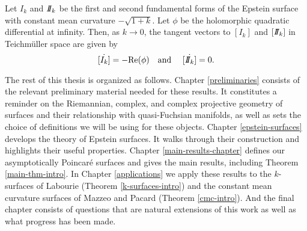 \begin{bigthm} \label{cmc-intro}
Let $I_k$ and $I\!\!I_k$ be the first and second fundamental forms of the Epstein surface with constant mean curvature $-\sqrt{1+k}$.
Let $\phi$ be the holomorphic quadratic differential at infinity. 
Then, as $k \to 0$, the tangent vectors to $[I_k]$ and $[I\!\!I_k]$ in Teichm\"uller space are given by 
\[
  \dot{[I_k]}= - \mathrm{Re}(\phi) \quad \text{and } \quad \dot{[I\!\!I_k]} = 0.
\]
\end{bigthm}

The rest of this thesis is organized as follows. 
Chapter \ref{preliminaries} consists of the relevant preliminary material needed for these results. 
It constitutes a reminder on the Riemannian, complex, and complex projective geometry of surfaces and their relationship with quasi-Fuchsian manifolds, as well as sets the choice of definitions we will be using for these objects. 
Chapter \ref{epstein-surfaces} develops the theory of Epstein surfaces.
It walks through their construction and highlights their useful properties. 
Chapter \ref{main-results-chapter} defines our asymptotically Poincar\'e surfaces and gives the main results, including Theorem \ref{main-thm-intro}.
In Chapter \ref{applications} we apply these results to the $k$-surfaces of Labourie (Theorem \ref{k-surfaces-intro}) and the constant mean curvature surfaces of Mazzeo and Pacard (Theorem \ref{cmc-intro}). 
And the final chapter consists of questions that are natural extensions of this work as well as what progress has been made.